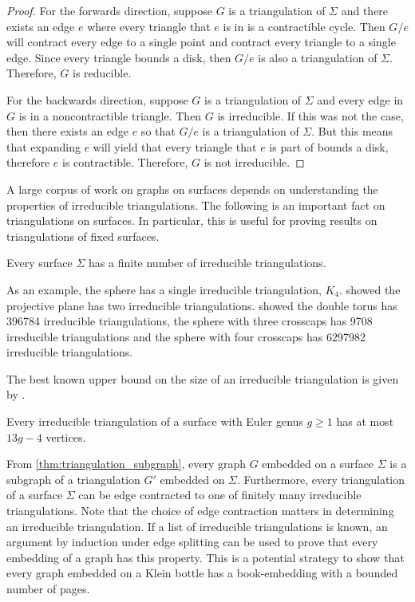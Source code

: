 \begin{proof}
    For the forwards direction, suppose $G$ is a triangulation of $\Sigma$ and there exists an edge $e$ where every triangle that $e$ is in is a contractible cycle. Then $G/ e$ will contract every edge to a single point and contract every triangle to a single edge. Since every triangle bounds a disk, then $G / e$ is also a triangulation of $\Sigma$. Therefore, $G$ is reducible. 

    For the backwards direction, suppose $G$ is a triangulation of $\Sigma$ and every edge in $G$ is in a noncontractible triangle. Then $G$ is irreducible. If this was not the case, then there exists an edge $e$ so that $G / e$ is a triangulation of $\Sigma$. But this means that expanding $e$ will yield that every triangle that $e$ is part of bounds a disk, therefore $e$ is contractible. Therefore, $G$ is not irreducible.
\end{proof}

A large corpus of work on graphs on surfaces depends on understanding the properties of irreducible triangulations. The following is an important fact on triangulations on surfaces. In particular, this is useful for proving results on triangulations of fixed surfaces. 

\begin{theorem}
    Every surface $\Sigma$ has a finite number of irreducible triangulations.
\end{theorem}
As an example, the sphere has a single irreducible triangulation, $K_4$. \textcite{barnetteAll2manifoldsHave1989} showed the projective plane has two irreducible triangulations. \textcite{sulankeGeneratingIrreducibleTriangulations2006} showed the double torus has 396784 irreducible triangulations, the sphere with three crosscaps has 9708 irreducible triangulations and the sphere with four crosscaps has 6297982 irreducible triangulations.

The best known upper bound on the size of an irreducible triangulation is given by \textcite{joretIrreducibleTriangulationsAre2010}.

\begin{theorem}
    Every irreducible triangulation of a surface with Euler genus $g \geq 1$ has at most $13g - 4$ vertices. 
\end{theorem}

From \cref{thm:triangulation_subgraph}, every graph $G$ embedded on a surface $\Sigma$ is a subgraph of a triangulation $G'$ embedded on $\Sigma$. Furthermore, every triangulation of a surface $\Sigma$ can be edge contracted to one of finitely many irreducible triangulations. Note that the choice of edge contraction matters in determining an irreducible triangulation. If a list of irreducible triangulations is known, an argument by induction under edge splitting can be used to prove that every embedding of a graph has this property. This is a potential strategy to show that every graph embedded on a Klein bottle has a book-embedding with a bounded number of pages. 

